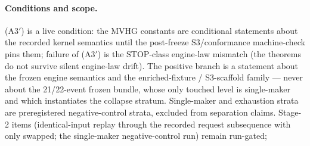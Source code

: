 \paragraph{Conditions and scope.} (A3$'$) is a live condition: the MVHG
constants are conditional statements about the recorded kernel semantics
until the post-freeze S3/conformance machine-check pins them; failure of
(A3$'$) is the STOP-class engine-law mismatch (the theorems do not survive
silent engine-law drift). The positive branch is a statement about the
frozen engine semantics and the enriched-fixture / S3-scaffold family ---
never about the 21/22-event frozen bundle, whose only touched level is
single-maker and which instantiates the collapse stratum. Single-maker and
exhaustion strata are preregistered negative-control strata, excluded from
separation claims. Stage-2 items (identical-input replay through the
recorded request subsequence with only  swapped; the
single-maker negative-control run) remain run-gated; \RESULTSPENDING{}
